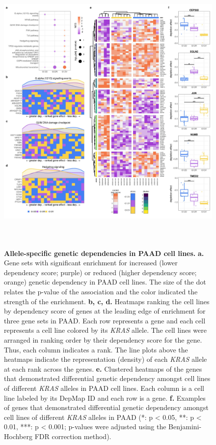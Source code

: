 \documentclass[english, 10pt, letterpaper]{article}
\newcommand{\KRAS}{\emph{KRAS}}
\begin{document}
\begin{figure}
\centering
\includegraphics[height=145mm]{figures/SuppFigure_13.jpeg}
\caption{
    \textbf{Allele-specific genetic dependencies in PAAD cell lines.}
    \textbf{a.} Gene sets with significant enrichment for increased (lower dependency score; purple) or reduced (higher dependency score; orange) genetic dependency in PAAD cell lines. The size of the dot relates the p-value of the association and the color indicated the strength of the enrichment.
    \textbf{b, c, d.} Heatmaps ranking the cell lines by dependency score of genes at the leading edge of enrichment for three gene sets in PAAD. Each row represents a gene and each cell represents a cell line colored by its \KRAS{} allele. The cell lines were arranged in ranking order by their dependency score for the gene. Thus, each column indicates a rank. The line plots above the heatmaps indicate the representation (density) of each \KRAS{} allele at each rank across the genes.
    \textbf{e.} Clustered heatmaps of the genes that demonstrated differential genetic dependency amongst cell lines of different \KRAS{} alleles in PAAD cell lines. Each column is a cell line labeled by its DepMap ID and each row is a gene.
    \textbf{f.} Examples of genes that demonstrated differential genetic dependency amongst cell lines of different \KRAS{} alleles in PAAD (*: p < 0.05, **: p < 0.01, ***: p < 0.001; p-values were adjusted using the Benjamini-Hochberg FDR correction method).
}
\label{sfig:paad-dependency-main}
\end{figure}
\end{document}
